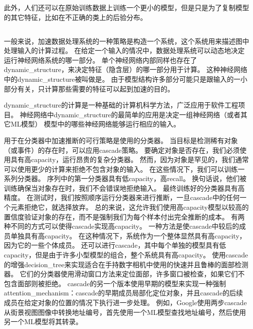 此外，人们还可以在原始训练数据上训练一个更小的模型，但是只是为了复制模型的其它特征，比如在不正确的类上的后验分布\citep{Hinton-dark-2014,hinton2015distilling}。

\subsection{}
\label{sec:dynamic_structure}

一般来说，加速数据处理系统的一种策略是构造一个系统，这个系统用来描述图中处理输入的计算过程。
在给定一个输入的情况中，数据处理系统可以动态地决定运行神经网络系统的哪一部分。
单个神经网络内部同样也存在了\gls{dynamic_structure}，来决定特征（隐含层）的哪一部分用于计算。
这种神经网络中的\gls{dynamic_structure}被叫做是\citep{bengio2013estimating,bengio-arxiv13-condcomp}。
由于模型结构许多部分可能只是跟输入的一小部分有关，只计算那些需要的特征可以起到加速的目的。

\gls{dynamic_structure}的计算是一种基础的计算机科学方法，广泛应用于软件工程项目。
神经网络中\gls{dynamic_structure}的最简单的应用是决定一组神经网络（或者其它\gls{ML}模型）
模型中的哪些神经网络能够运行相应的输入。

用于在分类器中加速推断的可行策略是使用的分类器。 当目标是检测稀有对象（或事件）的存在时，可以应用\gls{cascade}策略。
要确定对象是否存在，我们必须使用具有高\gls{capacity}，运行昂贵的复杂分类器。 
然而，因为对象是罕见的，我们通常可以使用更少的计算来拒绝不包含对象的输入。
在这些情况下，我们可以训练一系列分类器。
序列中的第一分类器具有低\gls{capacity}，高\gls{recall}。
换句话说，他们被训练确保当对象存在时，我们不会错误地拒绝输入。
最终训练好的分类器具有高精度。
在测试时，我们按照顺序运行分类器来进行推断，一旦\gls{cascade}中的任何一个元素拒绝它，就选择放弃。
总的来说，这允许我们使用高\gls{capacity}模型以较高的置信度验证对象的存在，而不是强制我们为每个样本付出完全推断的成本。
有两种不同的方式可以使得\gls{cascade}实现高\gls{capacity}。
一种方法是使\gls{cascade}中较后的成员单独具有高\gls{capacity}。
在这种情况下，系统作为一个整体显然具有高\gls{capacity}，因为它的一些个体成员。 还可以进行\gls{cascade}，其中每个单独的模型具有低\gls{capacity}，但是由于许多小型模型的组合，整个系统具有高\gls{capacity}。
\citet{Viola01}使用\gls{cascade}的增强\gls{decision_tree}来实现适合在手持数字相机中使用的快速并且鲁棒的面部检测器。
它们的分类器使用滑动窗口方法来定位面部，许多窗口被检查，如果它们不包含面部则被拒绝。
\gls{cascade}的另一个版本使用早期的模型来实现一种强制\gls{attention_mechanism}：\gls{cascade}的早期成员局部化定位对象，并且\gls{cascade}的后续成员在给定对象的位置的情况下执行进一步处理。
例如，Google使用两步\gls{cascade}从街景视图图像中转换地址编号，首先使用一个\gls{ML}模型查找地址编号，然后使用另一个\gls{ML}模型将其转录\citep{Goodfellow+et+al-ICLR2014a}。

